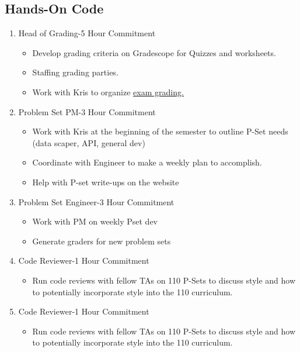 \documentclass[a4paper]{article}
\begin{document}
\subsection{Hands-On Code}
\begin{enumerate}
\item Head of Grading-5 Hour Commitment
\begin{itemize}
\item Develop grading criteria on Gradescope for Quizzes and worksheets. 
\item Staffing grading parties. 
\item Work with Kris to organize \hyperref[exam_grading]{exam grading.} 
\end{itemize}
\item Problem Set PM-3 Hour Commitment
\begin{itemize}
\item Work with Kris at the beginning of the semester to outline P-Set needs (data scaper, API, general dev)
\item Coordinate with Engineer to make a weekly plan to accomplish. 
\item Help with P-set write-ups on the website
\end{itemize}
\item Problem Set Engineer-3 Hour Commitment
\begin{itemize}
\item Work with PM on weekly Pset dev
\item Generate graders for new problem sets
\end{itemize}
\item Code Reviewer-1 Hour Commitment
\begin{itemize}
\item Run code reviews with fellow TAs on 110 P-Sets to discuss style and how to potentially incorporate style into the 110 curriculum. 
\end{itemize}
\item Code Reviewer-1 Hour Commitment 
\begin{itemize}
\item Run code reviews with fellow TAs on 110 P-Sets to discuss style and how to potentially incorporate style into the 110 curriculum. 
\end{itemize}
\end{enumerate}
\end{document}
